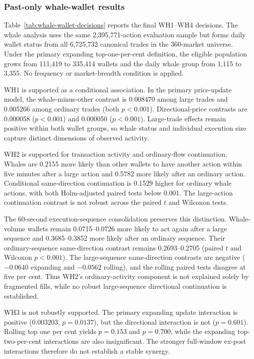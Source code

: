 

\subsubsection{Past-only whale-wallet results}
\label{sec:whale-wallet-results}

Table~\ref{tab:whale-wallet-decisions} reports the final WH1--WH4 decisions.
The whale analysis uses the same 2,395,771-action evaluation sample but forms
daily wallet status from all 6,725,732 canonical trades in the 360-market
universe. Under the primary expanding top-one-per-cent definition, the eligible
population grows from 111,419 to 335,414 wallets and the daily whale group from
1,115 to 3,355. No frequency or market-breadth condition is applied.

WH1 is supported as a conditional association. In the primary price-update
model, the whale-minus-other contrast is 0.008470 among large trades and
0.005266 among ordinary trades (both $p<0.001$). Directional-price contrasts
are 0.000058 ($p<0.001$) and 0.000050 ($p<0.001$). Large-trade effects remain
positive within both wallet groups, so whale status and individual execution
size capture distinct dimensions of observed activity.

WH2 is supported for transaction activity and ordinary-flow continuation.
Whales are 0.2155 more likely than other wallets to have another action within
five minutes after a large action and 0.5782 more likely after an ordinary
action. Conditional same-direction continuation is 0.1529 higher for ordinary
whale actions, with both Holm-adjusted paired tests below 0.001. The large-action
continuation contrast is not robust across the paired $t$ and Wilcoxon tests.

The 60-second execution-sequence consolidation preserves this distinction.
Whale-volume wallets remain 0.0715--0.0726 more likely to act again after a
large sequence and 0.3685--0.3852 more likely after an ordinary sequence. Their
ordinary-sequence same-direction contrast remains 0.2693--0.2705 (paired $t$
and Wilcoxon $p<0.001$). The large-sequence same-direction contrasts are
negative ($-0.0640$ expanding and $-0.0562$ rolling), and the rolling paired
tests disagree at five per cent. Thus WH2's ordinary-activity component is not
explained solely by fragmented fills, while no robust large-sequence directional
continuation is established.

WH3 is not robustly supported. The primary expanding update interaction is
positive ($0.003203$, $p=0.0137$), but the directional interaction is not
($p=0.601$). Rolling top one per cent yields $p=0.153$ and $p=0.700$, while the
expanding top-two-per-cent interactions are also insignificant. The stronger
full-window ex-post interactions therefore do not establish a stable synergy.

